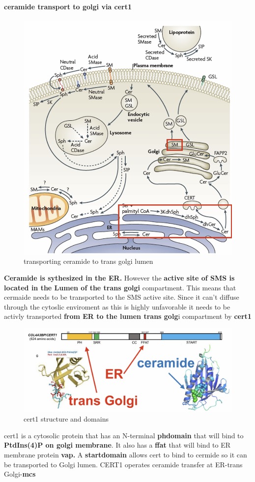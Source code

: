 \documentclass[../main.tex]{subfiles}
\begin{document}
\paragraph{ceramide transport to golgi via cert1}
\begin{figure}[H]
    \centering
    \includegraphics[width=0.5\linewidth]{topologyProblem.png}
    \caption{transporting ceramide to trans golgi lumen}
    \label{fig:trasport}
\end{figure}
\textbf{Ceramide is sythesized in the ER.} However the \textbf{active site of SMS is located in the Lumen of the trans golgi} compartment. This means that cermaide needs to be transported to the SMS active site. Since it can't diffuse through the cytoslic enviroment as this is highly unfavorable it needs to be activly transported \textbf{from ER to the lumen trans golg}i compartment by \textbf{\gls{cert1}}
\begin{figure}[H]
    \centering
    \includegraphics[width=0.5\linewidth]{cert1.png}
    \caption{cert1 structure and domains}
    \label{fig:enter-label}
\end{figure}
cert1 is a cytosolic protein that has an N-terminal \textbf{\gls{phdomain}} that will bind to \textbf{PtdIns(4)P on golgi membrane}. It also has a \textbf{\gls{ffat}} that will bind to ER membrane protein \textbf{\gls{vap}.} A \textbf{\gls{startdomain}} allows cert to bind to cermide so it can be transported to Golgi lumen. CERT1 operates ceramide transfer at 
ER-trans Golgi-\textbf{\gls{mcs}}
\end{document}
